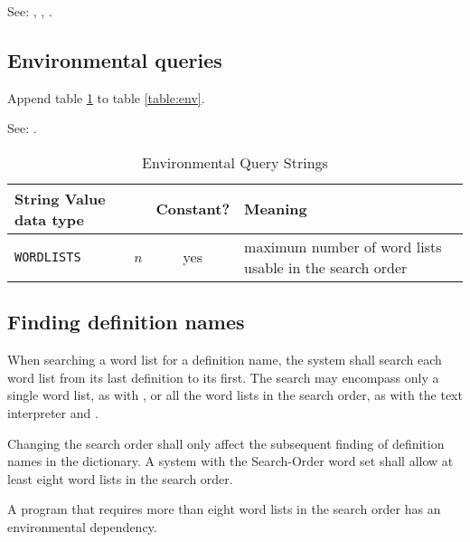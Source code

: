See: ,
,
.

\subsection{Environmental queries} %

Append table \ref{search:env} to table \ref{table:env}.

See: .

\begin{table}[ht]
  \begin{center}
	\caption{Environmental Query Strings}
	\label{search:env}
	\begin{tabular}{p{10em}rcp{}}
		\hline\hline
		\multicolumn{2}{l}{String \hfill Value data type} & Constant? & Meaning \\
		\hline
		\texttt{WORDLISTS}			& \emph{n}		& yes	&
			maximum number of word lists usable in the search order\\
		\hline\hline
	\end{tabular}
  \end{center}
\end{table}

\subsection{Finding definition names} %
\label{search:find}

When searching a word list for a definition name, the system shall
search each word list from its last definition to its first. The
search may encompass only a single word list, as with
, or all the word lists in the search order,
as with the text interpreter and .

Changing the search order shall only affect the subsequent finding
of definition names in the dictionary. A system with the Search-Order
word set shall allow at least eight word lists in the search order.


A program that requires more than eight word lists in the search
order has an environmental dependency.

